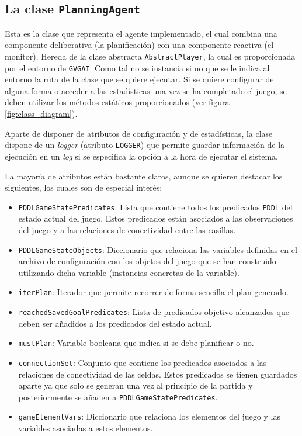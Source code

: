 \subsection{La clase \texttt{PlanningAgent}}

Esta es la clase que representa el agente implementado, el cual combina una componente deliberativa
(la planificación) con una componente reactiva (el monitor). Hereda de la clase abstracta
\texttt{AbstractPlayer}, la cual es proporcionada por el entorno de \texttt{GVGAI}. Como
tal no se instancia si no que se le indica al entorno la ruta de la clase que se quiere ejecutar.
Si se quiere configurar de alguna forma o acceder a las estadísticas una vez se ha completado
el juego, se deben utilizar los métodos estáticos proporcionados (ver figura \ref{fig:class_diagram}).

Aparte de disponer de atributos de configuración y de estadísticas, la clase dispone de un \textit{logger}
(atributo \texttt{LOGGER}) que permite guardar información de la ejecución en un \textit{log} si
se especifica la opción a la hora de ejecutar el sistema.

La mayoría de atributos están bastante claros, aunque se quieren destacar los siguientes, los cuales
son de especial interés:

\begin{itemize}[label=\textbullet]
    \item \texttt{PDDLGameStatePredicates}: Lista que contiene todos los predicados \texttt{PDDL} del estado
    actual del juego. Estos predicados están asociados a las observaciones del juego y a las relaciones
    de conectividad entre las casillas.
    
    \item \texttt{PDDLGameStateObjects}: Diccionario que relaciona las variables definidas en el archivo
    de configuración con los objetos del juego que se han construido utilizando dicha variable (instancias
    concretas de la variable).
    
    \item \texttt{iterPlan}: Iterador que permite recorrer de forma sencilla el plan generado.
    
    \item \texttt{reachedSavedGoalPredicates}: Lista de predicados objetivo alcanzados que deben
    ser añadidos a los predicados del estado actual.
    
    \item \texttt{mustPlan}: Variable booleana que indica si se debe planificar o no.
    
    \item \texttt{connectionSet}: Conjunto que contiene los predicados asociados a las relaciones
    de conectividad de las celdas. Estos predicados se tienen guardados aparte ya que solo se
    generan una vez al principio de la partida y posteriormente se añaden a \texttt{PDDLGameStatePredicates}.
    
    \item \texttt{gameElementVars}: Diccionario que relaciona los elementos del juego y las
    variables asociadas a estos elementos.
\end{itemize}

